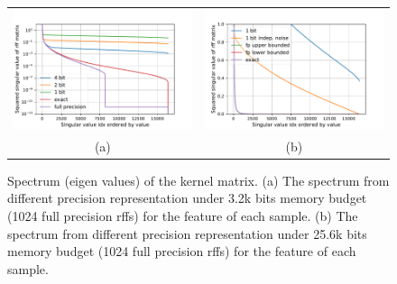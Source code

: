 \begin{figure}
	\centering
	\begin{tabular}{c c}
		\includegraphics[width=.45\linewidth]{figures/spectrum_8192.pdf} &
		\includegraphics[width=.45\linewidth]{figures/different_spectrum_with_same_kernel_approx_error.pdf} \\
		(a) & (b)
	\end{tabular}
	\caption{Spectrum (eigen values) of the kernel matrix. (a) The spectrum from different precision representation under 3.2k bits memory budget (1024 full precision rffs) for the feature of each sample. (b) The spectrum from different precision representation under 25.6k bits memory budget (1024 full precision rffs) for the feature of each sample.}
\end{figure}


